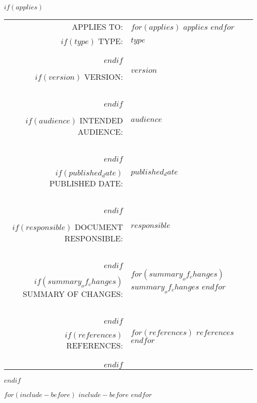 \documentclass[$if(fontsize)$$fontsize$,$endif$$if(lang)$$babel-lang$,$endif$$if(papersize)$$papersize$paper,$endif$$for(classoption)$$classoption$$sep$,$endfor$]{$documentclass$}
\begin{document}
$if(applies)$
    \vspace*{5cm}
    \begin{center}
        \begin{tabular}{ r l }

            {\color{gray}APPLIES TO:}               & \parbox[t]{8cm}{$for(applies)$ \textbf{$applies$} \\ $endfor$} \\

            $if(type)$
            {\color{gray}TYPE:}                     & \parbox[t]{8cm}{\textbf{$type$}} \\
            $endif$

            $if(version)$
            {\color{gray}VERSION:}                  & \parbox[t]{8cm}{$version$} \\
            $endif$

            $if(audience)$
            {\color{gray}INTENDED AUDIENCE:}           & \parbox[t]{8cm}{$audience$} \\
            $endif$

            $if(published_date)$
            {\color{gray}PUBLISHED DATE:}           & \parbox[t]{8cm}{$published_date$} \\
            $endif$

            $if(responsible)$
            {\color{gray}DOCUMENT RESPONSIBLE:}     & \parbox[t]{8cm}{$responsible$} \\
            $endif$

            $if(summary_of_changes)$
            {\color{gray}SUMMARY OF CHANGES:}       & \parbox[t]{8cm}{$for(summary_of_changes)$ $summary_of_changes$ \\ $endfor$} \\
            $endif$

            $if(references)$
            {\color{gray}REFERENCES:}               & \parbox[t]{8cm}{$for(references)$ $references$ \\ $endfor$} \\
            $endif$

        \end{tabular}
    \end{center}
    \newpage
$endif$

$for(include-before)$
    $include-before$
    \newpage
$endfor$

\vspace*{1cm}
\end{document}
